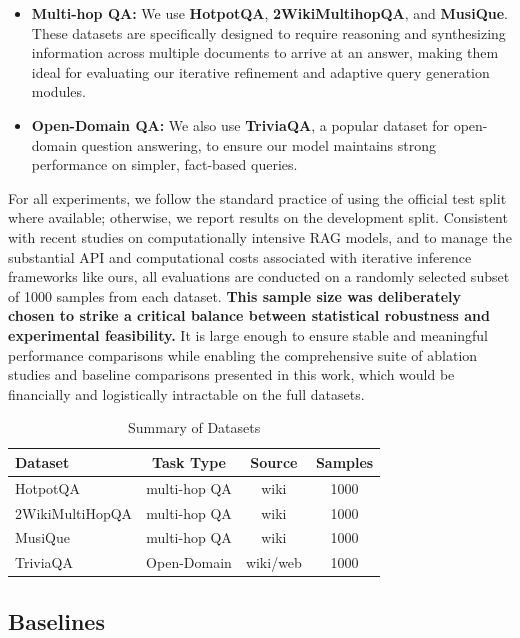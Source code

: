 \documentclass[11pt]{article}
\begin{document}
\begin{itemize}
    \item \textbf{Multi-hop QA:} We use \textbf{HotpotQA}, \textbf{2WikiMultihopQA}, and \textbf{MusiQue}. These datasets are specifically designed to require reasoning and synthesizing information across multiple documents to arrive at an answer, making them ideal for evaluating our iterative refinement and adaptive query generation modules.
    \item \textbf{Open-Domain QA:} We also use \textbf{TriviaQA}, a popular dataset for open-domain question answering, to ensure our model maintains strong performance on simpler, fact-based queries.
\end{itemize}

For all experiments, we follow the standard practice of using the official test split where available; otherwise, we report results on the development split. Consistent with recent studies on computationally intensive RAG models, and to manage the substantial API and computational costs associated with iterative inference frameworks like ours, all evaluations are conducted on a randomly selected subset of 1000 samples from each dataset. \textbf{This sample size was deliberately chosen to strike a critical balance between statistical robustness and experimental feasibility.} It is large enough to ensure stable and meaningful performance comparisons while enabling the comprehensive suite of ablation studies and baseline comparisons presented in this work, which would be financially and logistically intractable on the full datasets.

\begin{table}[t]
\centering
\small
\begin{tabular}{@{}lccc@{}}
\hline
\textbf{Dataset} & \textbf{Task Type} & \textbf{Source} & \textbf{Samples} \\
\hline
HotpotQA & multi-hop QA & wiki & 1000 \\
2WikiMultiHopQA & multi-hop QA & wiki & 1000 \\
MusiQue & multi-hop QA & wiki & 1000 \\
TriviaQA & Open-Domain & wiki/web & 1000 \\
\hline
\end{tabular}
\caption{Summary of Datasets}
\label{tab:datasets}
\end{table}

\subsection{Baselines}
\end{document}
